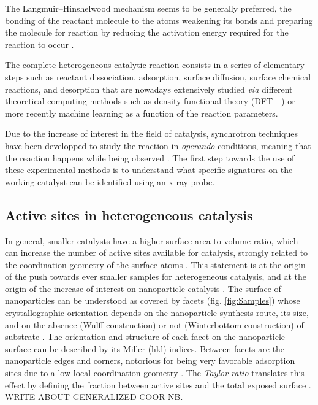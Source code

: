 
The Langmuir–Hinshelwood mechanism seems to be generally preferred, the bonding of the reactant molecule to the atoms weakening its bonds and preparing the molecule for reaction by reducing the activation energy required for the reaction to occur \parencite{Baxter2002}.

The complete heterogeneous catalytic reaction consists in a series of elementary steps such as reactant dissociation, adsorption, surface diffusion, surface chemical reactions, and desorption that are nowadays extensively studied \textit{via} different theoretical computing methods such as density-functional theory (DFT - \cite{Reuter2004, Molenbroek2009, Yawei2015, Gaggioli2019, Chatelier2020}) or more recently machine learning \parencite{Kitchin2018, Schlexer2019, Anstine2023} as a function of the reaction parameters.

Due to the increase of interest in the field of catalysis, synchrotron techniques have been developped to study the reaction in \textit{operando} conditions, meaning that the reaction happens while being observed \parencite{Meirer2018}.
The first step towards the use of these experimental methods is to understand what specific signatures on the working catalyst can be identified using an x-ray probe.

\subsection{Active sites in heterogeneous catalysis}

In general, smaller catalysts have a higher surface area to volume ratio, which can increase the number of active sites available for catalysis, strongly related to the coordination geometry of the surface atoms \parencite{Vogt2022}.
This statement is at the origin of the push towards ever smaller samples for heterogeneous catalysis, and at the origin of the increase of interest on nanoparticle catalysis \parencite{CHE1989, Molenbroek2009, Schauermann2013}.
The surface of nanoparticles can be understood as covered by facets (fig. \ref{fig:Samples}) whose crystallographic orientation depends on the nanoparticle synthesis route, its size, and on the absence (Wulff construction) or not (Winterbottom construction) of substrate \parencite{Boukouvala2021}.
The orientation and structure of each facet on the nanoparticle surface can be described by its Miller (hkl) indices.
Between facets are the nanoparticle edges and corners, notorious for being very favorable adsorption sites due to a low local coordination geometry \parencite{Jiang2009, CalleVallejo2014, CalleVallejo2018}.
The \textit{Taylor ratio} translates this effect by defining the fraction between active sites and the total exposed surface \parencite{Taylor1925}.
WRITE ABOUT GENERALIZED COOR NB.

